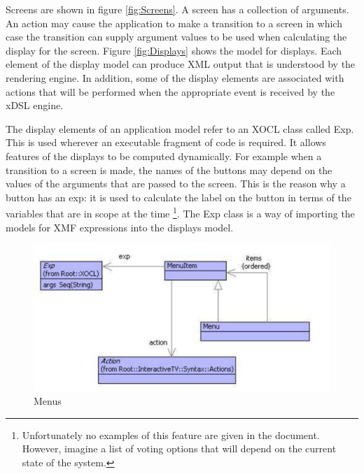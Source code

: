 Screens are shown in figure \ref{fig:Screens}. A screen has a collection
of arguments. An action may cause the application to make a transition
to a screen in which case the transition can supply argument values
to be used when calculating the display for the screen. Figure \ref{fig:Displays}
shows the model for displays. Each element of the display model can
produce XML output that is understood by the rendering engine. In
addition, some of the display elements are associated with actions
that will be performed when the appropriate event is received by the
xDSL engine.

The display elements of an application model refer to an XOCL class
called Exp. This is used wherever an executable fragment of code is
required. It allows features of the displays to be computed dynamically.
For example when a transition to a screen is made, the names of the
buttons may depend on the values of the arguments that are passed
to the screen. This is the reason why a button has an exp: it is used
to calculate the label on the button in terms of the variables that
are in scope at the time%
\footnote{Unfortunately no examples of this feature are given in the document.
However, imagine a list of voting options that will depend on the
current state of the system.%
}. The Exp class is a way of importing the models for XMF expressions
into the displays model.

%
\begin{figure}
\begin{center}
\includegraphics[scale=0.75]{CaseStudy4/figures/Menus.pdf}

\caption{Menus\label{fig:Menus}}
\end{center}
\end{figure}


